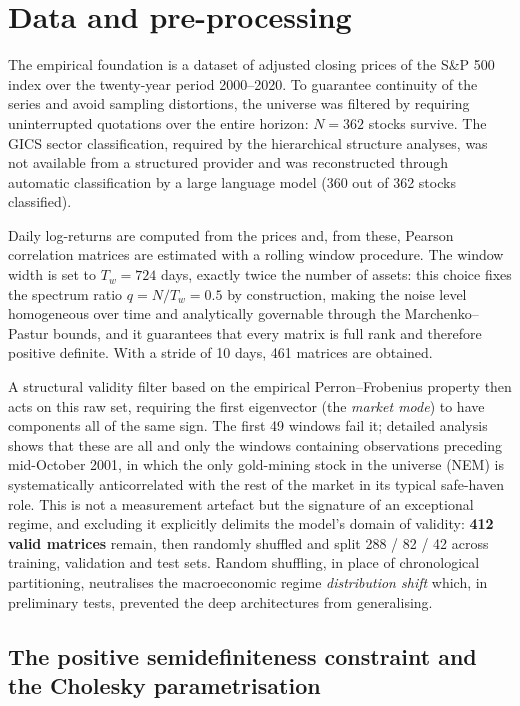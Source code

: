 \documentclass[11pt,a4paper]{article}
\begin{document}
\section{Data and pre-processing}

The empirical foundation is a dataset of adjusted closing prices of the
S\&P 500 index over the twenty-year period 2000--2020. To guarantee continuity
of the series and avoid sampling distortions, the universe was filtered by
requiring uninterrupted quotations over the entire horizon: $N = 362$ stocks
survive. The GICS sector classification, required by the hierarchical
structure analyses, was not available from a structured provider and was
reconstructed through automatic classification by a large language model
(360 out of 362 stocks classified).

Daily log-returns are computed from the prices and, from these, Pearson
correlation matrices are estimated with a rolling window procedure. The window
width is set to $T_w = 724$ days, exactly twice the number of assets: this
choice fixes the spectrum ratio $q = N/T_w = 0.5$ by construction, making the
noise level homogeneous over time and analytically governable through the
Marchenko--Pastur bounds, and it guarantees that every matrix is full rank and
therefore positive definite. With a stride of 10 days, 461 matrices are
obtained.

A structural validity filter based on the empirical Perron--Frobenius property
then acts on this raw set, requiring the first eigenvector (the \emph{market
mode}) to have components all of the same sign. The first 49 windows fail it;
detailed analysis shows that these are all and only the windows containing
observations preceding mid-October 2001, in which the only gold-mining stock
in the universe (NEM) is systematically anticorrelated with the rest of the
market in its typical safe-haven role. This is not a measurement artefact but
the signature of an exceptional regime, and excluding it explicitly delimits
the model's domain of validity: \textbf{412 valid matrices} remain, then
randomly shuffled and split 288 / 82 / 42 across training, validation and test
sets. Random shuffling, in place of chronological partitioning, neutralises
the macroeconomic regime \emph{distribution shift} which, in preliminary
tests, prevented the deep architectures from generalising.

\subsection*{The positive semidefiniteness constraint and the Cholesky parametrisation}
\end{document}
